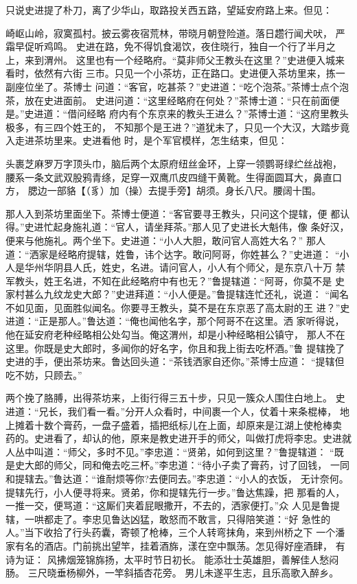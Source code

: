 只说史进提了朴刀，离了少华山，取路投关西五路，望延安府路上来。但见：

崎岖山岭，寂寞孤村。披云雾夜宿荒林，带晓月朝登险道。落日趱行闻犬吠，
严霜早促听鸡鸣。
史进在路，免不得饥食渴饮，夜住晓行，独自一个行了半月之上，来到渭州。
这里也有一个经略府。“莫非师父王教头在这里？”史进便入城来看时，依然有六街
三市。只见一个小茶坊，正在路口。史进便入茶坊里来，拣一副座位坐了。茶博士
问道：“客官，吃甚茶？”史进道：“吃个泡茶。”茶博士点个泡茶，放在史进面前。
史进问道：“这里经略府在何处？”茶博士道：“只在前面便是。”史进道：“借问经略
府内有个东京来的教头王进么？”茶博士道：“这府里教头极多，有三四个姓王的，
不知那个是王进？”道犹未了，只见一个大汉，大踏步竟入走进茶坊里来。史进看他
时，是个军官模样，怎生结束，但见：

头裹芝麻罗万字顶头巾，脑后两个太原府纽丝金环，上穿一领鹦哥绿纻丝战袍，
腰系一条文武双股鸦青绦，足穿一双鹰爪皮四缝干黄靴。生得面圆耳大，鼻直口方，
腮边一部貉【（豸）加（操）去提手旁】胡须。身长八尺。腰阔十围。

那人入到茶坊里面坐下。茶博士便道：“客官要寻王教头，只问这个提辖，便
都认得。”史进忙起身施礼道：“官人，请坐拜茶。”那人见了史进长大魁伟，像
条好汉，便来与他施礼。两个坐下。史进道：“小人大胆，敢问官人高姓大名？”
那人道：“洒家是经略府提辖，姓鲁，讳个达字。敢问阿哥，你姓甚么？”史进道：
“小人是华州华阴县人氏，姓史，名进。请问官人，小人有个师父，是东京八十万
禁军教头，姓王名进，不知在此经略府中有也无？”鲁提辖道：“阿哥，你莫不是
史家村甚么九纹龙史大郎？”史进拜道：“小人便是。”鲁提辖连忙还礼，说道：
“闻名不如见面，见面胜似闻名。你要寻王教头，莫不是在东京恶了高太尉的王
进？”史进道：“正是那人。”鲁达道：“俺也闻他名字，那个阿哥不在这里。洒
家听得说，他在延安府老种经略相公处勾当。俺这渭州，却是小种经略相公镇守，
那人不在这里。你既是史大郎时，多闻你的好名字，你且和我上街去吃杯酒。”鲁
提辖挽了史进的手，便出茶坊来。鲁达回头道：“茶钱洒家自还你。”茶博士应道：
“提辖但吃不妨，只顾去。”

两个挽了胳膊，出得茶坊来，上街行得三五十步，只见一簇众人围住白地上。
史进道：“兄长，我们看一看。”分开人众看时，中间裹一个人，仗着十来条棍棒，
地上摊着十数个膏药，一盘子盛着，插把纸标儿在上面，却原来是江湖上使枪棒卖
药的。史进看了，却认的他，原来是教史进开手的师父，叫做打虎将李忠。史进就
人丛中叫道：“师父，多时不见。”李忠道：“贤弟，如何到这里？”鲁提辖道：
“既是史大郎的师父，同和俺去吃三杯。”李忠道：“待小子卖了膏药，讨了回钱，
一同和提辖去。”鲁达道：“谁耐烦等你?去便同去。”李忠道：“小人的衣饭，
无计奈何。提辖先行，小人便寻将来。贤弟，你和提辖先行一步。”鲁达焦躁，把
那看的人，一推一交，便骂道：“这厮们夹着屁眼撒开，不去的，洒家便打。”众
人见是鲁提辖，一哄都走了。李忠见鲁达凶猛，敢怒而不敢言，只得陪笑道：“好
急性的人。”当下收拾了行头药囊，寄顿了枪棒，三个人转弯抹角，来到州桥之下
一个潘家有名的酒店。门前挑出望竿，挂着酒旆，漾在空中飘荡。怎见得好座酒肆，
有诗为证：
风拂烟笼锦旆扬，太平时节日初长。
能添壮士英雄胆，善解佳人愁闷肠。
三尺晓垂杨柳外，一竿斜插杏花旁。
男儿未遂平生志，且乐高歌入醉乡。

